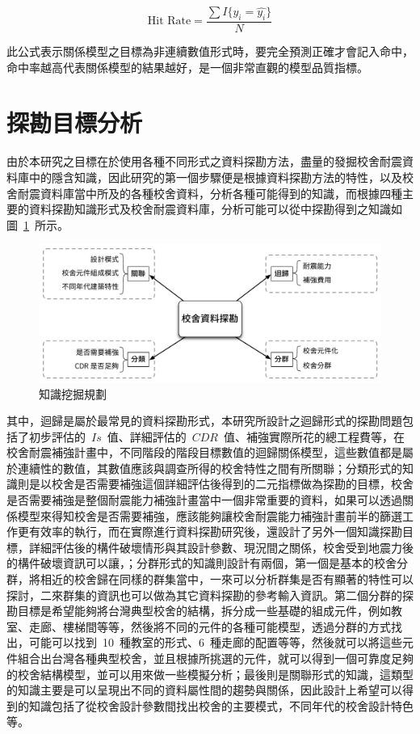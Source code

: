 \begin{equation} \text{Hit Rate} = \dfrac{ \sum{I\{y_i = \hat{y_i}\}} }{N} \label{eq:hitrate}\end{equation} 

此公式表示關係模型之目標為非連續數值形式時，要完全預測正確才會記入命中，命中率越高代表關係模型的結果越好，是一個非常直觀的模型品質指標。



\section{探勘目標分析}

由於本研究之目標在於使用各種不同形式之資料探勘方法，盡量的發掘校舍耐震資料庫中的隱含知識，因此研究的第一個步驟便是根據資料探勘方法的特性，以及校舍耐震資料庫當中所及的各種校舍資料，分析各種可能得到的知識，而根據四種主要的資料探勘知識形式及校舍耐震資料庫，分析可能可以從中探勘得到之知識如圖~\ref{fig:bigpicture}~所示。

\begin{figure}[hbtp]
  \begin{center}
    \includegraphics[width=1.0\textwidth]{figures/big-picture.pdf}
    \caption{知識挖掘規劃} 
    \label{fig:bigpicture}
  \end{center}
\end{figure}

其中，迴歸是屬於最常見的資料探勘形式，本研究所設計之迴歸形式的探勘問題包括了初步評估的~$Is$~值、詳細評估的~$CDR$~值、補強實際所花的總工程費等，在校舍耐震補強計畫中，不同階段的階段目標數值的迴歸關係模型，這些數值都是屬於連續性的數值，其數值應該與調查所得的校舍特性之間有所關聯；分類形式的知識則是以校舍是否需要補強這個詳細評估後得到的二元指標做為探勘的目標，校舍是否需要補強是整個耐震能力補強計畫當中一個非常重要的資料，如果可以透過關係模型來得知校舍是否需要補強，應該能夠讓校舍耐震能力補強計畫前半的篩選工作更有效率的執行，而在實際進行資料探勘研究後，還設計了另外一個知識探勘目標，詳細評估後的構件破壞情形與其設計參數、現況間之關係，校舍受到地震力後的構件破壞資訊可以讓，；分群形式的知識則設計有兩個，第一個是基本的校舍分群，將相近的校舍歸在同樣的群集當中，一來可以分析群集是否有顯著的特性可以探討，二來群集的資訊也可以做為其它資料探勘的參考輸入資訊。第二個分群的探勘目標是希望能夠將台灣典型校舍的結構，拆分成一些基礎的組成元件，例如教室、走廊、樓梯間等等，然後將不同的元件的各種可能模型，透過分群的方式找出，可能可以找到~10~種教室的形式、6~種走廊的配置等等，然後就可以將這些元件組合出台灣各種典型校舍，並且根據所挑選的元件，就可以得到一個可靠度足夠的校舍結構模型，並可以用來做一些模擬分析；最後則是關聯形式的知識，這類型的知識主要是可以呈現出不同的資料屬性間的趨勢與關係，因此設計上希望可以得到的知識包括了從校舍設計參數間找出校舍的主要模式，不同年代的校舍設計特色等。

